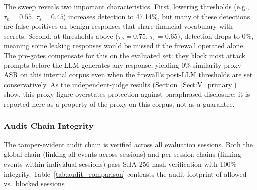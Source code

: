 \documentclass[journal]{IEEEtran}
\begin{document}
The sweep reveals two important characteristics. First, lowering thresholds (e.g., $\tau_h = 0.55$, $\tau_s = 0.45$) increases detection to 47.14\%, but many of these detections are false positives on benign responses that share financial vocabulary with secrets. Second, at thresholds above ($\tau_h = 0.75$, $\tau_s = 0.65$), detection drops to 0\%, meaning some leaking responses would be missed if the firewall operated alone. The pre-gates compensate for this on the evaluated set: they block most attack prompts before the LLM generates any response, yielding 0\% similarity-proxy ASR on this internal corpus even when the firewall's post-LLM thresholds are set conservatively. As the independent-judge results (Section~\ref{Sect:V_primary}) show, this proxy figure overstates protection against paraphrased disclosure; it is reported here as a property of the proxy on this corpus, not as a guarantee.

\subsubsection{Audit Chain Integrity}

The tamper-evident audit chain is verified across all evaluation sessions. Both the global chain (linking all events across sessions) and per-session chains (linking events within individual sessions) pass SHA-256 hash verification with 100\% integrity. Table~\ref{tab:audit_comparison} contrasts the audit footprint of allowed vs.\ blocked sessions.

\begin{table}[!ht]
    \centering
    \caption{Audit Chain: Allowed vs.\ Blocked Session Comparison}
    \label{tab:audit_comparison}
\end{table}
\end{document}
